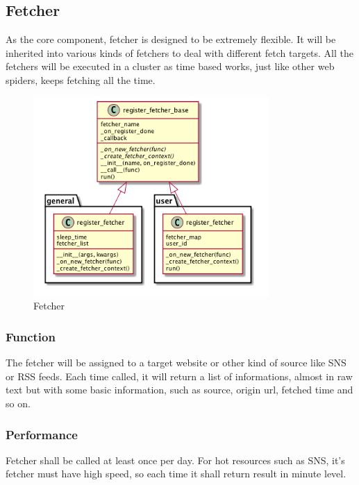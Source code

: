 
\subsection{Fetcher}
  As the core component, fetcher is designed to be extremely flexible.
  It will be inherited into various kinds of fetchers to deal with different fetch targets.
  All the fetchers will be executed in a cluster as time based works, just like other web spiders, keeps fetching all the time.

  \begin{figure}[H]
    \centering
    \includegraphics[width=0.8\textwidth]{img/fetcher.png}
    \caption{Fetcher\label{fig:fetcher}}
  \end{figure}

  \subsubsection{Function}
    The fetcher will be assigned to a target website or other kind of source like SNS or RSS feeds.
    Each time called, it will return a list of informations, almost in raw text but with some basic information,
    such as source, origin url, fetched time and so on.

  \subsubsection{Performance}
    Fetcher shall be called at least once per day. For hot resources such as SNS, it's fetcher must have high speed,
    so each time it shall return result in minute level.

